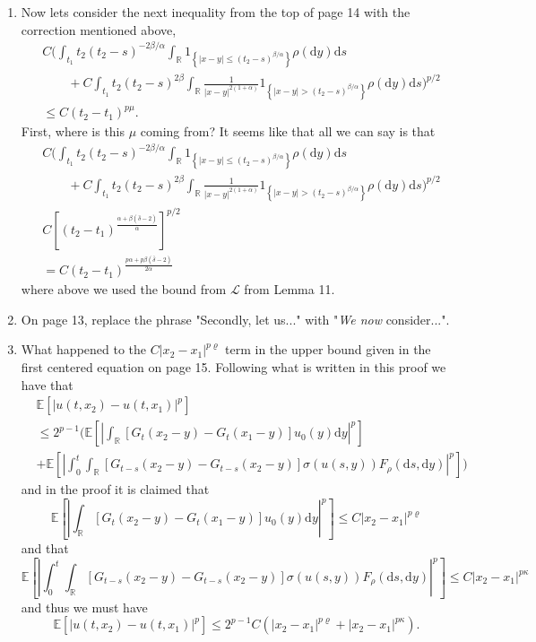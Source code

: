 \documentclass[a4paper,11pt]{article}
\numberwithin{equation}{section}
\numberwithin{equation}{section}
\theoremstyle{plain}
\theoremstyle{definition}
\newcommand{\ud}{\ensuremath{\mathrm{d} }}
\newcommand{\R}{\mathbb{R}}
\begin{document}
\begin{enumerate}
	\item
Now lets consider the next inequality from the top of page 14 with the correction mentioned above,
	\begin{align*}
		& C \bigg(\int_{t_1}{t_2} (t_2 - s)^{-2\beta/\alpha} \int_{\R}1_{\left\{ |x-y| \le (t_2-s)^{\beta / \alpha} \right\}}\rho(\ud y) \ud s 
	\\ & \quad \quad + C \int_{t_1}{t_2} (t_2-s)^{2\beta} \int_{\R} \frac{1}{|x-y|^{2(1+\alpha)}}1_{\left\{ |x-y| > (t_2-s)^{\beta / \alpha} \right\}} \rho(\ud y) \ud s\bigg)^{p/2}
	\\ & \le C(t_2-t_1)^{p\mu}. 		
	\end{align*}
First, where is this $\mu$ coming from? It seems like that all we can say is that 
	\begin{align*}
		& C \bigg(\int_{t_1}{t_2} (t_2 - s)^{-2\beta/\alpha} \int_{\R}1_{\left\{ |x-y| \le (t_2-s)^{\beta / \alpha} \right\}}\rho(\ud y) \ud s 
		\\ & \quad \quad + C \int_{t_1}{t_2} (t_2-s)^{2\beta} \int_{\R} \frac{1}{|x-y|^{2(1+\alpha)}}1_{\left\{ |x-y| > (t_2-s)^{\beta / \alpha} \right\}} \rho(\ud y) \ud s\bigg)^{p/2}
		\\ & C\left[ \left( t_2-t_1\right)^{\frac{\alpha+\beta(\bar{\delta}-2)}{\alpha}} \right]^{p/2}
		\\& = C\left( t_2-t_1\right)^{\frac{p\alpha+p\beta(\bar{\delta}-2)}{2\alpha}} 
	\end{align*}	
where above we used the bound from $\mathcal{L}$ from Lemma 11. 

	\item
On page 13, replace the phrase "Secondly, let us..." with "\textit{We now} consider...".

	\item
What happened to the $C|x_2-x_1|^{p\varrho}$ term in the upper bound given in the first centered equation on page 15. Following what is written in this proof we have that 
	\begin{align*}
		&\mathbb{E}\left[ |u(t,x_2)-u(t,x_1)|^p \right] 
	\\ &\le 2^{p-1} \Bigg( \mathbb{E}\left[ \left| \int_{\R} [G_t(x_2-y)-G_t(x_1-y)]u_0(y) \ud y \right|^p \right]
	\\ & +  \mathbb{E}\left[ \left| \int_0^t\int_{\R} [ G_{t-s}(x_2-y)-G_{t-s}(x_2-y) ] \sigma(u(s,y)) F_{\rho}(\ud s, \ud y)  \right|^p \right] \Bigg)
	\end{align*}
and in the proof it is claimed that 
	\[
		 \mathbb{E}\left[ \left| \int_{\R} [G_t(x_2-y)-G_t(x_1-y)]u_0(y) \ud y \right|^p \right] \le C|x_2-x_1|^{p\varrho}
	\]
and that 
	\[
		\mathbb{E}\left[ \left| \int_0^t\int_{\R} [ G_{t-s}(x_2-y)-G_{t-s}(x_2-y) ] \sigma(u(s,y)) F_{\rho}(\ud s, \ud y)  \right|^p \right]  \le C|x_2-x_1|^{p\kappa}
	\]
and thus we must have 
	\[
		\mathbb{E}\left[ |u(t,x_2)-u(t,x_1)|^p \right]  \le 2^{p-1}C\left(|x_2-x_1|^{p\varrho}+ |x_2-x_1|^{p\kappa} \right).
	\]
\end{enumerate}
\end{document}
